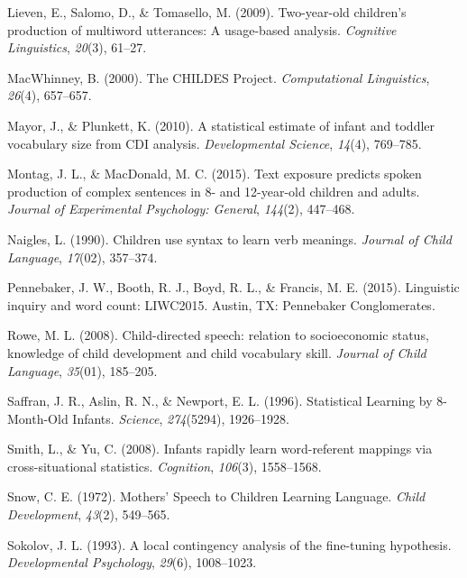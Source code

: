 \documentclass[10pt, letterpaper]{article}
\begin{document}
\leavevmode\hypertarget{ref-Lieven:2009ii}{}%
Lieven, E., Salomo, D., \& Tomasello, M. (2009). Two-year-old children's
production of multiword utterances: A usage-based analysis.
\emph{Cognitive Linguistics}, \emph{20}(3), 61--27.

\leavevmode\hypertarget{ref-MacWhinney:2000jx}{}%
MacWhinney, B. (2000). The CHILDES Project. \emph{Computational
Linguistics}, \emph{26}(4), 657--657.

\leavevmode\hypertarget{ref-Mayor:2010kp}{}%
Mayor, J., \& Plunkett, K. (2010). A statistical estimate of infant and
toddler vocabulary size from CDI analysis. \emph{Developmental Science},
\emph{14}(4), 769--785.

\leavevmode\hypertarget{ref-Montag:2015iy}{}%
Montag, J. L., \& MacDonald, M. C. (2015). Text exposure predicts spoken
production of complex sentences in 8- and 12-year-old children and
adults. \emph{Journal of Experimental Psychology: General},
\emph{144}(2), 447--468.

\leavevmode\hypertarget{ref-Naigles:1990cw}{}%
Naigles, L. (1990). Children use syntax to learn verb meanings.
\emph{Journal of Child Language}, \emph{17}(02), 357--374.

\leavevmode\hypertarget{ref-Pennebaker:kqtgxul0}{}%
Pennebaker, J. W., Booth, R. J., Boyd, R. L., \& Francis, M. E. (2015).
Linguistic inquiry and word count: LIWC2015. Austin, TX: Pennebaker
Conglomerates.

\leavevmode\hypertarget{ref-ROWE:2008go}{}%
Rowe, M. L. (2008). Child-directed speech: relation to socioeconomic
status, knowledge of child development and child vocabulary skill.
\emph{Journal of Child Language}, \emph{35}(01), 185--205.

\leavevmode\hypertarget{ref-Anonymous:6O2YEUCo}{}%
Saffran, J. R., Aslin, R. N., \& Newport, E. L. (1996). Statistical
Learning by 8-Month-Old Infants. \emph{Science}, \emph{274}(5294),
1926--1928.

\leavevmode\hypertarget{ref-Smith:2008gp}{}%
Smith, L., \& Yu, C. (2008). Infants rapidly learn word-referent
mappings via cross-situational statistics. \emph{Cognition},
\emph{106}(3), 1558--1568.

\leavevmode\hypertarget{ref-Snow:2018wf}{}%
Snow, C. E. (1972). Mothers' Speech to Children Learning Language.
\emph{Child Development}, \emph{43}(2), 549--565.

\leavevmode\hypertarget{ref-Sokolov:1993cr}{}%
Sokolov, J. L. (1993). A local contingency analysis of the fine-tuning
hypothesis. \emph{Developmental Psychology}, \emph{29}(6), 1008--1023.
\end{document}
